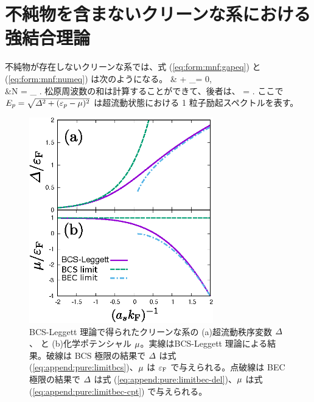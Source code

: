 \chapter{不純物を含まないクリーンな系における強結合理論}\label{sec:append:pure}

\label{sec:append:pure:bcsl}

不純物が存在しないクリーンな系では、式 (\ref{eq:form:mnf:gapeq}) と (\ref{eq:form:mnf:numeq}) は次のようになる。
\beq
& + \sum_{\bp} = 0,\label{eq:append:matsu:del}\\
&N = \sum_{\bp} .\label{eq:append:matsu:num}
\eeq
松原周波数の和は計算することができて、後者は、
\beq
 \sumn{}=  .\label{eq:append:matsu:int}
 \eeq
ここで $E_p = \sqrt{\varDelta^2 + (\varepsilon_p-\mu)^2}$ は超流動状態における 1 粒子励起スペクトルを表す。


\begin{figure}[t]
\centering
\includegraphics[width=80mm]{eps/pure-bcsl.eps}
\caption{BCS-Leggett 理論で得られたクリーンな系の (a)超流動秩序変数 $\varDelta$、 と (b)化学ポテンシャル $\mu$。実線はBCS-Leggett 理論による結果。破線は BCS 極限の結果で $\varDelta$ は式 (\ref{eq:append:pure:limitbcs})、$\mu$ は $\varepsilon_{\text{F}}$ で与えられる。点破線は BEC 極限の結果で $\varDelta$ は式 (\ref{eq:append:pure:limitbec-del})、$\mu$ は式 (\ref{eq:append:pure:limitbec-cpt}) で与えられる。}
\label{fig:bcsl:pure:bcsl}
\end{figure}


